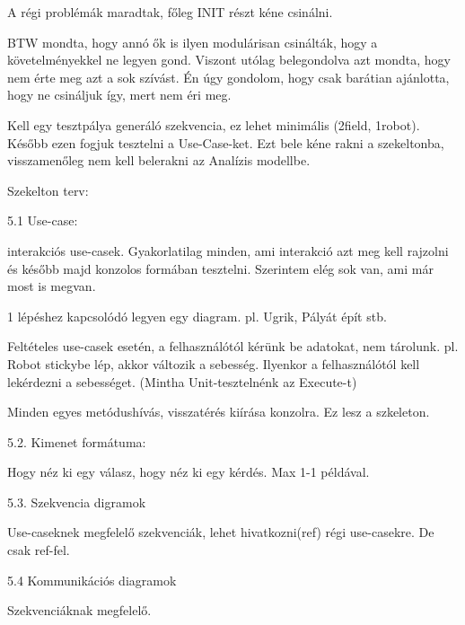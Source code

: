 \documentclass{article}
\begin{document}
\begin{itemsize}
	\item A régi problémák maradtak, főleg INIT részt kéne csinálni.
	\item BTW mondta, hogy annó ők is ilyen modulárisan csinálták, hogy a követelményekkel ne legyen gond. Viszont utólag belegondolva azt mondta, hogy nem érte meg azt a sok szívást. Én úgy gondolom, hogy csak barátian ajánlotta, hogy ne csináljuk így, mert nem éri meg.
	\item Kell egy tesztpálya generáló szekvencia, ez lehet minimális (2field, 1robot). Később ezen fogjuk tesztelni a Use-Case-ket. Ezt bele kéne rakni a szekeltonba, visszamenőleg nem kell belerakni az Analízis modellbe.
	\item Szekelton terv:
	\item 5.1 Use-case:
	\item interakciós use-casek. Gyakorlatilag minden, ami interakció azt meg kell rajzolni és később majd konzolos formában tesztelni. Szerintem elég sok van, ami már most is megvan.
	\item 1 lépéshez kapcsolódó legyen egy diagram. pl. Ugrik, Pályát épít stb.
	\item Feltételes use-casek esetén, a felhasználótól kérünk be adatokat, nem tárolunk. pl. Robot stickybe lép, akkor változik a sebesség. Ilyenkor a felhasználótól kell lekérdezni a sebességet. (Mintha Unit-tesztelnénk az Execute-t)
	\item Minden egyes metódushívás, visszatérés kiírása konzolra. Ez lesz a szkeleton.
	\item 5.2. Kimenet formátuma:
	\item Hogy néz ki egy válasz, hogy néz ki egy kérdés. Max 1-1 példával.
	\item 5.3. Szekvencia digramok
	\item Use-caseknek megfelelő szekvenciák, lehet hivatkozni(ref) régi use-casekre. De csak ref-fel.
	\item 5.4 Kommunikációs diagramok
	\item Szekvenciáknak megfelelő.
\end{itemsize}
\end{document}
